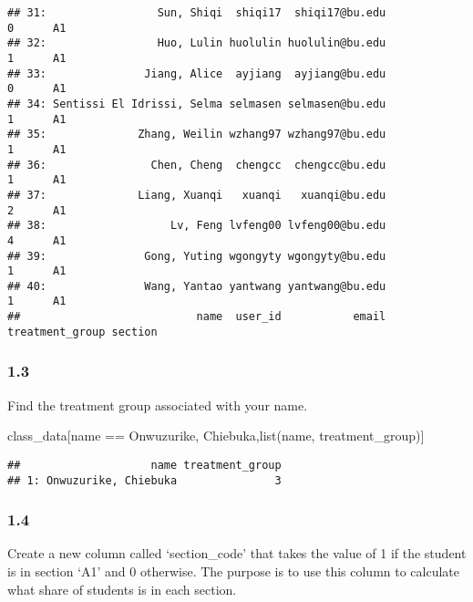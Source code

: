 \documentclass[
]{article}
\newenvironment{Shaded}{\begin{snugshade}}{\end{snugshade}}
\newcommand{\CommentTok}[1]{\textcolor[rgb]{0.56,0.35,0.01}{\textit{#1}}}
\newcommand{\ConstantTok}[1]{\textcolor[rgb]{0.00,0.00,0.00}{#1}}
\newcommand{\DocumentationTok}[1]{\textcolor[rgb]{0.56,0.35,0.01}{\textbf{\textit{#1}}}}
\newcommand{\ErrorTok}[1]{\textcolor[rgb]{0.64,0.00,0.00}{\textbf{#1}}}
\newcommand{\FunctionTok}[1]{\textcolor[rgb]{0.00,0.00,0.00}{#1}}
\newcommand{\NormalTok}[1]{#1}
\newcommand{\SpecialCharTok}[1]{\textcolor[rgb]{0.00,0.00,0.00}{#1}}
\newcommand{\StringTok}[1]{\textcolor[rgb]{0.31,0.60,0.02}{#1}}
\begin{document}
\begin{verbatim}
## 31:                 Sun, Shiqi  shiqi17  shiqi17@bu.edu               0      A1
## 32:                 Huo, Lulin huolulin huolulin@bu.edu               1      A1
## 33:               Jiang, Alice  ayjiang  ayjiang@bu.edu               0      A1
## 34: Sentissi El Idrissi, Selma selmasen selmasen@bu.edu               1      A1
## 35:              Zhang, Weilin wzhang97 wzhang97@bu.edu               1      A1
## 36:                Chen, Cheng  chengcc  chengcc@bu.edu               1      A1
## 37:              Liang, Xuanqi   xuanqi   xuanqi@bu.edu               2      A1
## 38:                   Lv, Feng lvfeng00 lvfeng00@bu.edu               4      A1
## 39:               Gong, Yuting wgongyty wgongyty@bu.edu               1      A1
## 40:               Wang, Yantao yantwang yantwang@bu.edu               1      A1
##                           name  user_id           email treatment_group section
\end{verbatim}

\hypertarget{section-1}{%
\subsubsection{1.3}\label{section-1}}

Find the treatment group associated with your name.

\begin{Shaded}
\begin{Highlighting}[]
\NormalTok{class\_data[name }\SpecialCharTok{==} \StringTok{\textquotesingle{}Onwuzurike, Chiebuka\textquotesingle{}}\NormalTok{,}\FunctionTok{list}\NormalTok{(name, treatment\_group)]}
\end{Highlighting}
\end{Shaded}

\begin{verbatim}
##                    name treatment_group
## 1: Onwuzurike, Chiebuka               3
\end{verbatim}

\hypertarget{section-2}{%
\subsubsection{1.4}\label{section-2}}

Create a new column called `section\_code' that takes the value of 1 if
the student is in section `A1' and 0 otherwise. The purpose is to use
this column to calculate what share of students is in each section.

\begin{Shaded}
\end{Shaded}
\end{document}
